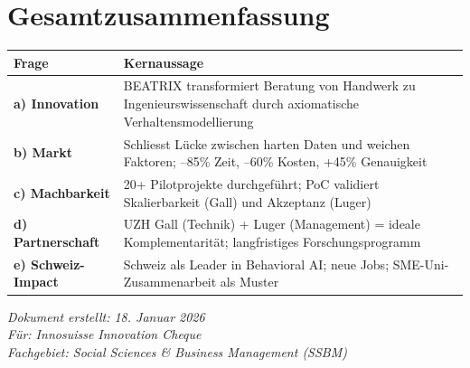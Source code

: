 \documentclass[11pt,a4paper]{article}
\begin{document}
\newpage

\section*{Gesamtzusammenfassung}

\begin{table}[h]
\centering
\begin{tabularx}{\textwidth}{lX}
\toprule
\textbf{Frage} & \textbf{Kernaussage} \\
\midrule
\textbf{a) Innovation} & BEATRIX transformiert Beratung von Handwerk zu Ingenieurswissenschaft durch axiomatische Verhaltensmodellierung \\
\textbf{b) Markt} & Schliesst Lücke zwischen harten Daten und weichen Faktoren; --85\% Zeit, --60\% Kosten, +45\% Genauigkeit \\
\textbf{c) Machbarkeit} & 20+ Pilotprojekte durchgeführt; PoC validiert Skalierbarkeit (Gall) und Akzeptanz (Luger) \\
\textbf{d) Partnerschaft} & UZH Gall (Technik) + Luger (Management) = ideale Komplementarität; langfristiges Forschungsprogramm \\
\textbf{e) Schweiz-Impact} & Schweiz als Leader in Behavioral AI; neue Jobs; SME-Uni-Zusammenarbeit als Muster \\
\bottomrule
\end{tabularx}
\end{table}

\vspace{1cm}

\begin{center}
\end{center}

\vspace{2cm}

\begin{flushright}
\textit{Dokument erstellt: 18. Januar 2026}\\
\textit{Für: Innosuisse Innovation Cheque}\\
\textit{Fachgebiet: Social Sciences \& Business Management (SSBM)}
\end{flushright}
\end{document}
